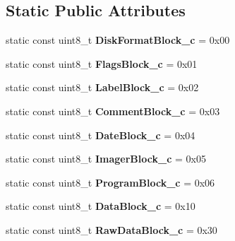 \subsection*{Static Public Attributes}
\begin{DoxyCompactItemize}
\item 
\hypertarget{classH17Disk_a9bbca767478f686785bbb432820103dc}{}static const uint8\+\_\+t {\bfseries Disk\+Format\+Block\+\_\+c} = 0x00\label{classH17Disk_a9bbca767478f686785bbb432820103dc}

\item 
\hypertarget{classH17Disk_a945579b168d52f682d6197f4a00e0693}{}static const uint8\+\_\+t {\bfseries Flags\+Block\+\_\+c} = 0x01\label{classH17Disk_a945579b168d52f682d6197f4a00e0693}

\item 
\hypertarget{classH17Disk_af2b94de0c8f90b5ba6692276c5763bf5}{}static const uint8\+\_\+t {\bfseries Label\+Block\+\_\+c} = 0x02\label{classH17Disk_af2b94de0c8f90b5ba6692276c5763bf5}

\item 
\hypertarget{classH17Disk_ab4e55131dd806954fda38f12c82f4ccd}{}static const uint8\+\_\+t {\bfseries Comment\+Block\+\_\+c} = 0x03\label{classH17Disk_ab4e55131dd806954fda38f12c82f4ccd}

\item 
\hypertarget{classH17Disk_afb42adda895a1c0a2679d1159b203807}{}static const uint8\+\_\+t {\bfseries Date\+Block\+\_\+c} = 0x04\label{classH17Disk_afb42adda895a1c0a2679d1159b203807}

\item 
\hypertarget{classH17Disk_a7d6a12e1f97bdde25bc8acbcd62a9b25}{}static const uint8\+\_\+t {\bfseries Imager\+Block\+\_\+c} = 0x05\label{classH17Disk_a7d6a12e1f97bdde25bc8acbcd62a9b25}

\item 
\hypertarget{classH17Disk_a2930786a1a6aeb478c29e48bf7167875}{}static const uint8\+\_\+t {\bfseries Program\+Block\+\_\+c} = 0x06\label{classH17Disk_a2930786a1a6aeb478c29e48bf7167875}

\item 
\hypertarget{classH17Disk_a718ad42cffb439324ba3b487ca99851b}{}static const uint8\+\_\+t {\bfseries Data\+Block\+\_\+c} = 0x10\label{classH17Disk_a718ad42cffb439324ba3b487ca99851b}

\item 
\hypertarget{classH17Disk_a55eaf676459f71f5509542b6cbf0f0c3}{}static const uint8\+\_\+t {\bfseries Raw\+Data\+Block\+\_\+c} = 0x30\label{classH17Disk_a55eaf676459f71f5509542b6cbf0f0c3}


\end{DoxyCompactItemize}
